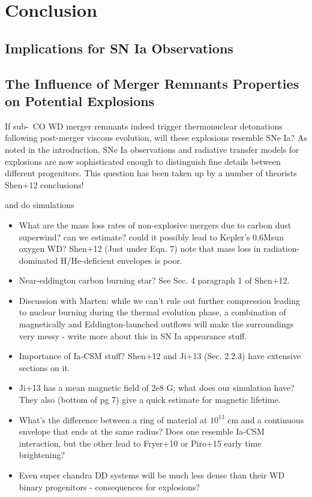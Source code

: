 \chapter{Conclusion}

\section{Implications for SN Ia Observations}

\section{The Influence of Merger Remnants Properties on Potential Explosions}

If sub-\Mch\ CO WD merger remnants indeed trigger thermonuclear detonations following post-merger viscous evolution, will these explosions resemble SNe Ia?  As noted in the introduction, SNe Ia observations and radiative transfer models for explosions are now sophisticated enough to distinguish fine details between different progenitors.  This question has been taken up by a number of theorists \citep{frye+10, shen+12}  Shen+12 conclusions!

\cite{frye+10} and \cite{rask+14} do simulations

\begin{itemize}
	\item What are the mass loss rates of non-explosive mergers due to carbon dust superwind?  can we estimate?  could it possibly lead to Kepler's 0.6Msun oxygen WD? Shen+12 (Just under Eqn. 7) note that mass loss in radiation-dominated H/He-deficient envelopes is poor. %
	\item Near-eddington carbon burning star?  See Sec. 4 paragraph 1 of Shen+12.
	\item Discussion with Marten: while we can't rule out further compression leading to nuclear burning during the thermal evolution phase, a combination of magnetically and Eddington-launched outflows will make the surroundings very messy - write more about this in SN Ia appearance stuff.
	\item Importance of Ia-CSM stuff?  Shen+12 and Ji+13 (Sec. 2.2.3) have extensive sections on it.
	\item Ji+13 has a mean magnetic field of 2e8 G; what does our simulation have?  They also (bottom of pg 7) give a quick estimate for magnetic lifetime.
	\item What's the difference between a ring of material at $10^{13}$ cm and a continuous envelope that ends at the same radius?  Does one resemble Ia-CSM interaction, but the other lead to Fryer+10 or Piro+15 early time brightening?
	\item Even super chandra DD systems will be much less dense than their WD binary progenitors - consequences for explosions?
\end{itemize}



